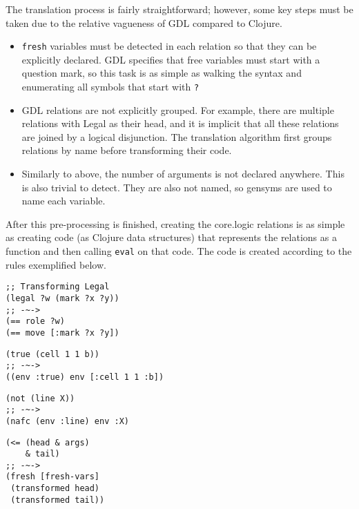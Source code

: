 \documentclass[letterpaper]{article}
\begin{document}
The translation process is fairly straightforward; however, some key steps must be taken due to the relative vagueness of GDL compared to Clojure.
\begin{itemize}
\item \texttt{fresh} variables must be detected in each relation so that they can be explicitly declared. GDL specifies that free variables must start with a question mark, so this task is as simple as walking the syntax and enumerating all symbols that start with \texttt{?}
\item GDL relations are not explicitly grouped. For example, there are multiple relations with Legal as their head, and it is implicit that all these relations are joined by a logical disjunction. The translation algorithm first groups relations by name before transforming their code.
\item Similarly to above, the number of arguments is not declared anywhere. This is also trivial to detect. They are also not named, so gensyms are used to name each variable.
\end{itemize}

After this pre-processing is finished, creating the core.logic relations is as simple as creating code (as Clojure data structures) that represents the relations as a function and then calling \texttt{eval} on that code. The code is created according to the rules exemplified below.
\begin{lstlisting}[frame=single, caption=Reflexive head calls turn into unifications]
;; Transforming Legal
(legal ?w (mark ?x ?y))
;; -~->
(== role ?w)
(== move [:mark ?x ?y])
\end{lstlisting}

\begin{lstlisting}[frame=single,caption=All other relations reference the environment]
(true (cell 1 1 b))
;; -~->
((env :true) env [:cell 1 1 :b])
\end{lstlisting}

\begin{lstlisting}[frame=single,caption=not turns into negation as failure constraint (nafc)]
(not (line X))
;; -~->
(nafc (env :line) env :X)
\end{lstlisting}

\begin{lstlisting}[frame=single,caption={\textless= relations are joined in a fresh block}]
(<= (head & args)
    & tail)
;; -~->
(fresh [fresh-vars]
 (transformed head)
 (transformed tail))
\end{lstlisting}
\end{document}
